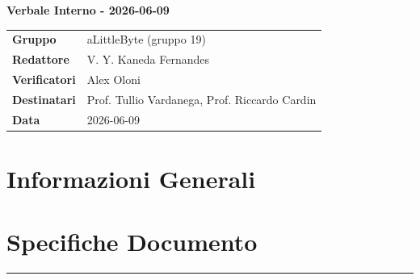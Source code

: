 \documentclass[a4paper,12pt]{article}
\begin{document}
\thispagestyle{firstpage}

\vspace*{0.5cm}

\begin{center}
    {\LARGE \textbf{Verbale Interno - 2026-06-09}}
\end{center}

\vspace{1.5cm}

\begin{center}
    \renewcommand{\arraystretch}{1.3}
    \begin{tcolorbox}[
        width=0.92\textwidth,
        colback=gray!6,
        colframe=gray!45,
        boxrule=0.5pt,
        arc=2mm,
        boxsep=0pt,
        left=8pt, right=8pt, top=8pt, bottom=8pt
    ]
        \begin{tabularx}{\linewidth}{>{\bfseries}p{3.5cm} X}
            Gruppo      & aLittleByte (gruppo 19) \\
            Redattore   & V. Y. Kaneda Fernandes \\
            Verificatori & Alex Oloni\\
            Destinatari & Prof. Tullio Vardanega, Prof. Riccardo Cardin \\
            Data        & 2026-06-09\\
        \end{tabularx}
    \end{tcolorbox}
\end{center}

\newpage

\tableofcontents
\newpage
\section{Informazioni Generali}
\section*{Specifiche Documento}
\hrule
\vspace{1cm}
\end{document}
